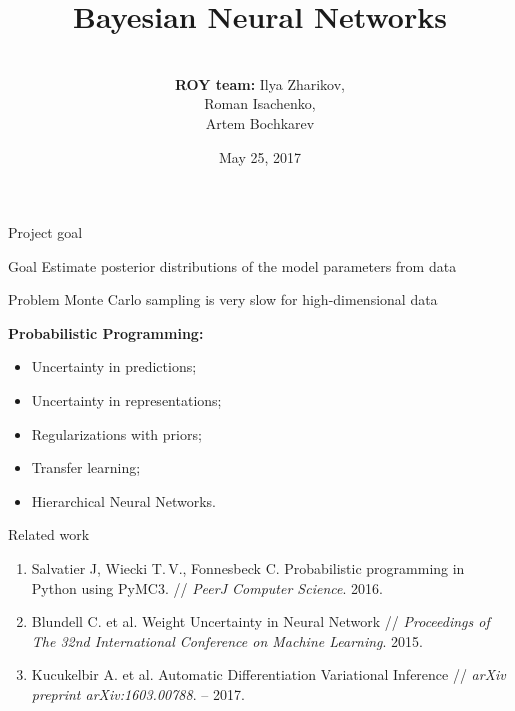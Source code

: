 \documentclass{beamer}
\title[\hbox to 56mm{Bayesian Neural Networks  \hfill\insertframenumber\,/\,\inserttotalframenumber}]
{Bayesian Neural Networks}
\author[ROY team]{\\
	{\small \textbf{ROY team:} Ilya Zharikov, \\ \hspace{2.67cm}Roman Isachenko, \\ \hspace{2.61cm}Artem Bochkarev}}
\institute[SkolTech]{Skolkovo Institute of Science and Technology \\
	Bayesian Methods course 
	\vspace{0.3cm}
}
\date{May 25, 2017}
\begin{document}
	\begin{frame}
		\titlepage
	\end{frame}
\begin{frame}{Project goal}	
	\begin{block}{Goal}
		Estimate posterior distributions of the model parameters from data
	\end{block}
	\begin{block}{Problem}
		Monte Carlo sampling is very slow for high-dimensional data
	\end{block}	

	\vfill

	\textbf{Probabilistic Programming:}
	\begin{itemize}
		\item Uncertainty in predictions;
		\item Uncertainty in representations;
		\item Regularizations with priors;
		\item Transfer learning;
		\item Hierarchical Neural Networks.
	\end{itemize}
\end{frame}
\begin{frame}{Related work}
	\begin{enumerate}
		\item Salvatier J, Wiecki T.\,V., Fonnesbeck C. Probabilistic programming in Python using PyMC3. // \emph{PeerJ Computer Science}. 2016.
		\vfill
		\item Blundell C. et al. Weight Uncertainty in Neural Network // \emph{Proceedings of The 32nd International Conference on Machine Learning}. 2015.
		\vfill
		\item Kucukelbir A. et al. Automatic Differentiation Variational Inference // \emph{arXiv preprint arXiv:1603.00788}. – 2017.
	\end{enumerate}
	
\end{frame}
\end{document}
